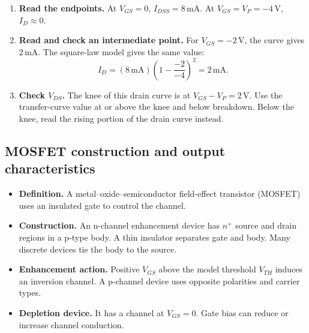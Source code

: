 \documentclass[12pt,a4paper]{article}
\begin{document}
\begin{tcolorbox}[examplebox,title={Read the gate-voltage curve and check the bias region}]
\begin{enumerate}[leftmargin=*, itemsep=3pt, topsep=4pt]
  \item \textbf{Read the endpoints.} At \(V_{GS}=0\), \(I_{DSS}=8\,\mathrm{mA}\). At \(V_{GS}=V_P=-4\,\mathrm V\), \(I_D\approx0\).
  \item \textbf{Read and check an intermediate point.} For \(V_{GS}=-2\,\mathrm V\), the curve gives \(2\,\mathrm{mA}\). The square-law model gives the same value:
  \[
    I_D=(8\,\mathrm{mA})\left(1-\frac{-2}{-4}\right)^2=2\,\mathrm{mA}.
  \]
  \item \textbf{Check \(V_{DS}\).} The knee of this drain curve is at \(V_{GS}-V_P=2\,\mathrm V\). Use the transfer-curve value at or above the knee and below breakdown. Below the knee, read the rising portion of the drain curve instead.
\end{enumerate}
\end{tcolorbox}

\subsection{MOSFET construction and output characteristics}
\begin{itemize}[leftmargin=*, itemsep=3pt, topsep=4pt]
  \item \textbf{Definition.} A metal--oxide--semiconductor field-effect transistor (MOSFET) uses an insulated gate to control the channel.
  \item \textbf{Construction.} An n-channel enhancement device has \(n^+\) source and drain regions in a p-type body. A thin insulator separates gate and body. Many discrete devices tie the body to the source.
  \item \textbf{Enhancement action.} Positive \(V_{GS}\) above the model threshold \(V_{TH}\) induces an inversion channel. A p-channel device uses opposite polarities and carrier types.
  \item \textbf{Depletion device.} It has a channel at \(V_{GS}=0\). Gate bias can reduce or increase channel conduction.
\end{itemize}
\end{document}
